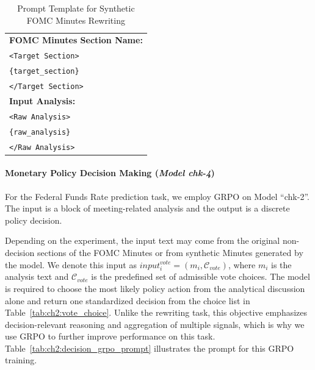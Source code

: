 \begin{table}[h]
\begin{tabular}{p{}}
    \textbf{FOMC Minutes Section Name:} \\
    \texttt{<Target Section>} \\
    \texttt{\{target\_section\}} \\
    \texttt{</Target Section>} \\

    \textbf{Input Analysis:} \\
    \texttt{<Raw Analysis>} \\
    \texttt{\{raw\_analysis\}} \\
    \texttt{</Raw Analysis>} \\
    \bottomrule
    \end{tabular}
    \caption{Prompt Template for Synthetic FOMC Minutes Rewriting}
    \label{tab:ch2:fomc_summary_prompt_training}
\end{table}




\paragraph*{Monetary Policy Decision Making (\textit{Model chk-4})}
For the Federal Funds Rate prediction task, we employ GRPO on Model ``chk-2''. The input is a block of meeting-related analysis and the output is a discrete policy decision.

Depending on the experiment, the input text may come from the original non-decision sections of the FOMC Minutes or from synthetic Minutes generated by the model. We denote this input as $input_i^{vote} = (m_i, \mathcal{C}_{vote})$, where $m_i$ is the analysis text and $\mathcal{C}_{vote}$ is the predefined set of admissible vote choices. The model is required to choose the most likely policy action from the analytical discussion alone and return one standardized decision from the choice list in Table~\ref{tab:ch2:vote_choice}. Unlike the rewriting task, this objective emphasizes decision-relevant reasoning and aggregation of multiple signals, which is why we use GRPO to further improve performance on this task. Table~\ref{tab:ch2:decision_grpo_prompt} illustrates the prompt for this GRPO training.

